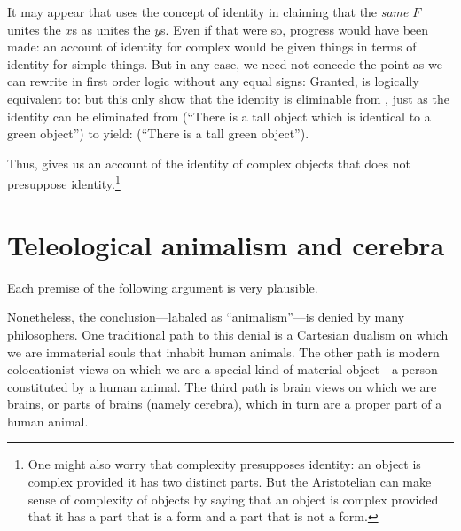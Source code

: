It may appear that  uses the concept of identity in claiming 
that the \textit{same} $F$ unites the $x$s as unites the $y$s. Even if that were so,
progress would have been made: an account of identity for complex would be given things 
in terms of identity for simple things. But in any case, we need not concede the point
as we can rewrite  in first order logic without any equal signs:
Granted,  is logically equivalent to:
but this only show that the identity is eliminable from ,
just as the identity can be eliminated from
(``There is a tall object which is identical to a green object'') to yield:
(``There is a tall green object'').

Thus,  gives us an account of the identity of complex objects
that does not presuppose identity.\footnote{One might also worry that complexity
presupposes identity: an object is complex provided it has two distinct parts.
But the Aristotelian can make sense of complexity of objects by saying that an
object is complex provided that it has a part that is a form and a part that is not
a form.}

\section{Teleological animalism and cerebra}
Each premise of the following argument is very plausible.

Nonetheless, the conclusion---labaled as ``animalism''---is denied by many philosophers. One traditional path to 
this denial is a Cartesian dualism on which we are immaterial souls that inhabit human animals. The other path 
is modern colocationist views on which we are a special kind of material object---a person---constituted by a human 
animal. The third path is brain views on which we are brains, or parts of brains (namely cerebra), which in turn are a 
proper part of a human animal. 

